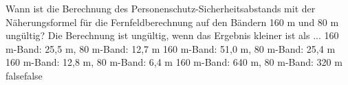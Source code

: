     {Wann ist die Berechnung des Personenschutz-Sicherheitsabstands mit der Näherungsformel für die Fernfeldberechnung auf den Bändern 160 m und 80 m ungültig? Die Berechnung ist ungültig, wenn das Ergebnis kleiner ist als ...}
    {160 m-Band: 25,5 m, 80 m-Band: 12,7 m}
    {160 m-Band: 51,0 m, 80 m-Band: 25,4 m}
    {160 m-Band: 12,8 m, 80 m-Band: 6,4 m}
    {160 m-Band: 640 m, 80 m-Band: 320 m}
    {false}{false}